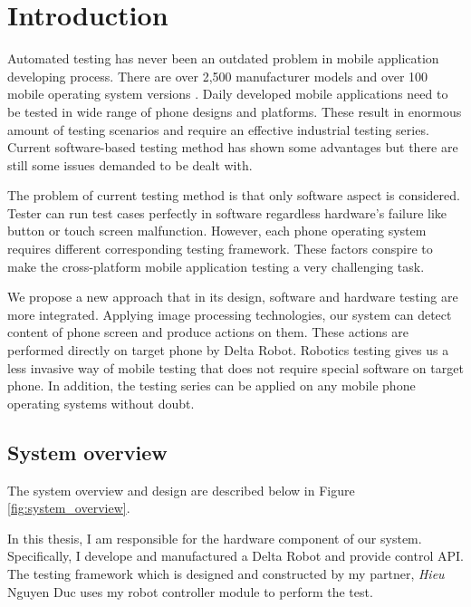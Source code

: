 \makeatletter
\def\maxwidth#1{\ifdim\Gin@nat@width>#1 #1\else\Gin@nat@width\fi}
\makeatother

\chapter{Introduction}

Automated testing has never been an outdated problem in mobile application developing process. There are over 2,500 manufacturer models and over 100 mobile operating system versions \cite{crittercism}. Daily developed mobile applications need to be tested in wide range of phone designs and platforms. These result in enormous amount of testing scenarios and require an effective industrial testing series. Current software-based testing method has shown some advantages but there are still some issues demanded to be dealt with.

The problem of current testing method is that only software aspect is considered. Tester can run test cases perfectly in software regardless hardware's failure like button or touch screen malfunction. However, each phone operating system requires different corresponding testing framework. These factors conspire to make the cross-platform mobile application testing a very challenging task. \nocite{weinman_thesis}

We propose a new approach that in its design, software and hardware testing are more integrated. Applying image processing technologies, our system can detect content of phone screen and produce actions on them. These actions are performed directly on target phone by Delta Robot. Robotics testing gives us a less invasive way of mobile testing that does not require special software on target phone. In addition, the testing series can be applied on any mobile phone operating systems without doubt.

\section{System overview}

The system overview and design are described below in Figure \ref{fig:system_overview}.

In this thesis, I am responsible for the hardware component of our system. Specifically, I develope and manufactured a Delta Robot and provide control API. The testing framework which is designed and constructed by my partner, \textit{Hieu} Nguyen Duc uses my robot controller module to perform the test.

